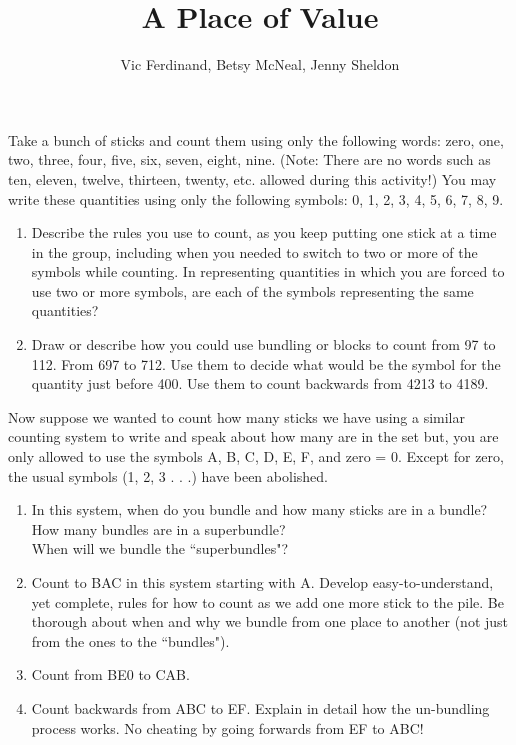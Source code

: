 \documentclass{ximera}
\title{A Place of Value}
\author{Vic Ferdinand, Betsy McNeal, Jenny Sheldon}
\begin{document}
\begin{abstract}\end{abstract}
\maketitle



\begin{problem}\label{PlaceOfValue1}
 Take a bunch of sticks and count them using only the following words: zero, one, two, three, four, five, six, seven, eight, nine. (Note:  There are no words such as ten, eleven, twelve, thirteen, twenty, etc. allowed during this activity!)  You may write these quantities using only the following symbols:  0, 1, 2, 3, 4, 5, 6, 7, 8, 9.
\begin{enumerate}
\item Describe the rules you use to count, as you keep putting one stick at a time in the group, including when you needed to switch to two or more of the symbols while counting.  In representing quantities in which you are forced to use two or more symbols, are each of the symbols representing the same quantities?  
\item Draw or describe how you could use bundling or blocks to count from 97 to 112.  From 697 to 712.  Use them to decide what would be the symbol for the quantity just before 400.  Use them to count backwards from 4213 to 4189.
\end{enumerate}
\end{problem}

\begin{problem} \label{PlaceOfValue2}
 Now suppose we wanted to count how many sticks we have using a similar counting system to write and speak about how many are in the set but, you are only allowed to use the symbols A, B, C, D, E, F, and zero = 0. Except for zero, the usual symbols (1, 2, 3 . . .) have been abolished.
\begin{enumerate}
\item In this system, when do you bundle and how many sticks are in a bundle?\\ How many bundles are in a superbundle?  \\
When will we bundle the ``superbundles"?  
\item Count to BAC in this system starting with A.   Develop easy-to-understand, yet complete, rules for how to count as we add one more stick to the pile.  Be thorough about when and why we bundle from one place to another (not just from the ones to the ``bundles").
\item Count from BE0 to CAB.  
\item Count backwards from ABC to EF. Explain in detail how the un-bundling process works. No cheating by going forwards from EF to ABC!  
\end{enumerate}
\end{problem}
\end{document}
